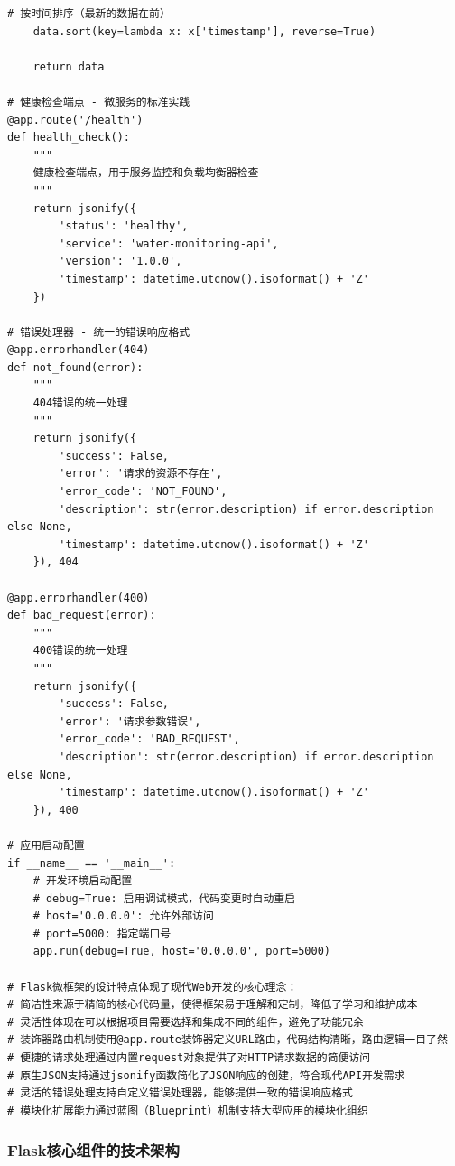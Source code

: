 \begin{lstlisting}[style=python]
    # 按时间排序（最新的数据在前）
    data.sort(key=lambda x: x['timestamp'], reverse=True)
    
    return data

# 健康检查端点 - 微服务的标准实践
@app.route('/health')
def health_check():
    """
    健康检查端点，用于服务监控和负载均衡器检查
    """
    return jsonify({
        'status': 'healthy',
        'service': 'water-monitoring-api',
        'version': '1.0.0',
        'timestamp': datetime.utcnow().isoformat() + 'Z'
    })

# 错误处理器 - 统一的错误响应格式
@app.errorhandler(404)
def not_found(error):
    """
    404错误的统一处理
    """
    return jsonify({
        'success': False,
        'error': '请求的资源不存在',
        'error_code': 'NOT_FOUND',
        'description': str(error.description) if error.description else None,
        'timestamp': datetime.utcnow().isoformat() + 'Z'
    }), 404

@app.errorhandler(400)
def bad_request(error):
    """
    400错误的统一处理
    """
    return jsonify({
        'success': False,
        'error': '请求参数错误',
        'error_code': 'BAD_REQUEST',
        'description': str(error.description) if error.description else None,
        'timestamp': datetime.utcnow().isoformat() + 'Z'
    }), 400

# 应用启动配置
if __name__ == '__main__':
    # 开发环境启动配置
    # debug=True: 启用调试模式，代码变更时自动重启
    # host='0.0.0.0': 允许外部访问
    # port=5000: 指定端口号
    app.run(debug=True, host='0.0.0.0', port=5000)

# Flask微框架的设计特点体现了现代Web开发的核心理念：
# 简洁性来源于精简的核心代码量，使得框架易于理解和定制，降低了学习和维护成本
# 灵活性体现在可以根据项目需要选择和集成不同的组件，避免了功能冗余
# 装饰器路由机制使用@app.route装饰器定义URL路由，代码结构清晰，路由逻辑一目了然
# 便捷的请求处理通过内置request对象提供了对HTTP请求数据的简便访问
# 原生JSON支持通过jsonify函数简化了JSON响应的创建，符合现代API开发需求
# 灵活的错误处理支持自定义错误处理器，能够提供一致的错误响应格式
# 模块化扩展能力通过蓝图（Blueprint）机制支持大型应用的模块化组织
\end{lstlisting}

\hypertarget{flaskux6838ux5fc3ux7ec4ux4ef6ux7684ux6280ux672fux67b6ux6784}{%
\subsubsection{Flask核心组件的技术架构}\label{flaskux6838ux5fc3ux7ec4ux4ef6ux7684ux6280ux672fux67b6ux6784}}

